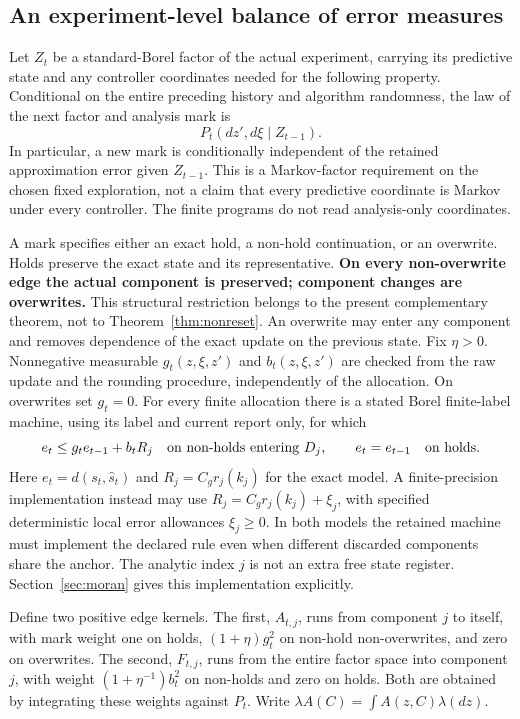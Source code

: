 \subsection{An experiment-level balance of error measures}
Let $Z_t$ be a standard-Borel factor of the actual experiment, carrying its predictive state and any controller coordinates needed for the following property. Conditional on the entire preceding history and algorithm randomness, the law of the next factor and analysis mark is
\[
 P_t(dz',d\xi\mid Z_{t-1}).
\]
In particular, a new mark is conditionally independent of the retained approximation error given $Z_{t-1}$. This is a Markov-factor requirement on the chosen fixed exploration, not a claim that every predictive coordinate is Markov under every controller. The finite programs do not read analysis-only coordinates.

A mark specifies either an exact hold, a non-hold continuation, or an overwrite. Holds preserve the exact state and its representative. \textbf{On every non-overwrite edge the actual component is preserved; component changes are overwrites.} This structural restriction belongs to the present complementary theorem, not to Theorem~\ref{thm:nonreset}. An overwrite may enter any component and removes dependence of the exact update on the previous state. Fix $\eta>0$. Nonnegative measurable $g_t(z,\xi,z')$ and $b_t(z,\xi,z')$ are checked from the raw update and the rounding procedure, independently of the allocation. On overwrites set $g_t=0$. For every finite allocation there is a stated Borel finite-label machine, using its label and current report only, for which
\begin{equation}\label{eq:bridge-local}
 e_t\le g_t e_{t-1}+b_t R_j\quad\hbox{on non-holds entering }D_j,
 \qquad e_t=e_{t-1}\quad\hbox{on holds}.
\end{equation}
Here $e_t=d(s_t,\widehat s_t)$ and $R_j=C_g r_j(k_j)$ for the exact model. A finite-precision implementation instead may use $R_j=C_g r_j(k_j)+\xi_j$, with specified deterministic local error allowances $\xi_j\ge0$. In both models the retained machine must implement the declared rule even when different discarded components share the anchor. The analytic index $j$ is not an extra free state register. Section~\ref{sec:moran} gives this implementation explicitly.

Define two positive edge kernels. The first, $A_{t,j}$, runs from component $j$ to itself, with mark weight one on holds, $(1+\eta)g_t^2$ on non-hold non-overwrites, and zero on overwrites. The second, $F_{t,j}$, runs from the entire factor space into component $j$, with weight $(1+\eta^{-1})b_t^2$ on non-holds and zero on holds. Both are obtained by integrating these weights against $P_t$. Write $\lambda A(C)=\int A(z,C)\lambda(dz)$.

